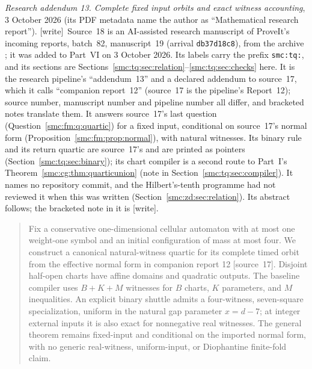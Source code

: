 \documentclass[11pt,letterpaper]{article}
\numberwithin{equation}{section}
\theoremstyle{definition}
\theoremstyle{remark}
\newcommand{\wtag}{\textup{[write]}}
\begin{document}
\bigskip
{}
\par
\noindent\emph{Research addendum 13. Complete fixed input orbits and exact witness accounting}, 3 October 2026 (its PDF metadata name the author as ``Mathematical research report''). \wtag\ Source~18 is an AI-assisted research manuscript of ProveIt's incoming reports, batch~82, manuscript~19 (arrival \texttt{db37d18c8}), from the archive ; it was added to Part~VI on 3 October 2026. Its labels carry the prefix \texttt{smc:tq:}, and its sections are Sections~\ref{smc:tq:sec:relation}--\ref{smc:tq:sec:checks} here. It is the research pipeline's ``addendum~13'' and a declared addendum to source~17, which it calls ``companion report~12'' (source~17 is the pipeline's Report~12); source number, manuscript number and pipeline number all differ, and bracketed notes translate them. It answers source~17's last question (Question~\ref{smc:fm:q:quartic}) for a fixed input, conditional on source~17's normal form (Proposition~\ref{smc:fm:prop:normal}), with natural witnesses. Its binary rule and its return quartic are source~17's and are printed as pointers (Section~\ref{smc:tq:sec:binary}); its chart compiler is a second route to Part~I's Theorem~\ref{smc:cg:thm:quarticunion} (note in Section~\ref{smc:tq:sec:compiler}). It names no repository commit, and the Hilbert's-tenth programme had not reviewed it when this was written (Section~\ref{smc:zd:sec:relation}). Its abstract follows; the bracketed note in it is \wtag.
\begin{quote}\small
Fix a conservative one-dimensional cellular automaton with at most one
weight-one symbol and an initial configuration of mass at most four.
We construct a canonical natural-witness quartic for its complete timed
orbit from the effective normal form in companion report 12 [source~17]. Disjoint
half-open charts have affine domains and quadratic outputs. The baseline
compiler uses $B+K+M$ witnesses for $B$ charts, $K$ parameters, and $M$
inequalities. An explicit binary shuttle admits a four-witness, seven-square
specialization, uniform in the natural gap parameter $x=d-7$; at integer
external inputs it is also exact for nonnegative real witnesses.
The general theorem remains fixed-input and conditional on the imported
normal form, with no generic real-witness, uniform-input, or Diophantine
finite-fold claim.
\end{quote}
\end{document}
